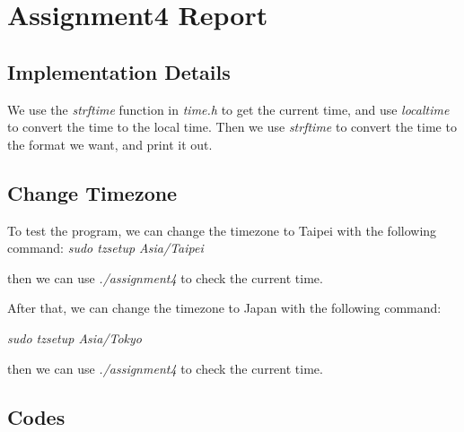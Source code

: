 \chapter{Assignment4 Report}


\section{Implementation Details}

We use the \textit{strftime} function in \textit{time.h} to get the current time, and use \textit{localtime} to convert the time to the local time.
Then we use \textit{strftime} to convert the time to the format we want, and print it out.

\section{Change Timezone}

To test the program, we can change the timezone to Taipei with the following command:
\textit{sudo tzsetup Asia/Taipei}

then we can use \textit{./assignment4} to check the current time.

After that, we can change the timezone to Japan with the following command:

\textit{sudo tzsetup Asia/Tokyo}

then we can use \textit{./assignment4} to check the current time.


\newpage
\section{Codes}



\newpage

